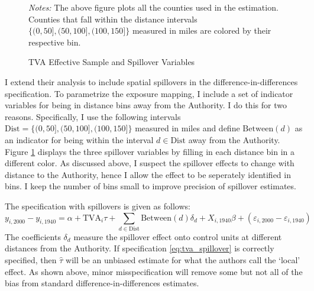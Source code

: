 \documentclass[11pt]{article}
\begin{document}
\begin{figure}[tb!]
    \caption{TVA Effective Sample and Spillover Variables}
    \label{fig:tva_sample}

    {\centering
    }

    {\footnotesize \textit{Notes:} The above figure plots all the counties used in the estimation. Counties that fall within the distance intervals $\{(0, 50], (50, 100], (100, 150]\}$ measured in miles are colored by their respective bin.}
\end{figure}

I extend their analysis to include spatial spillovers in the difference-in-differences specification. To parametrize the exposure mapping, I include a set of indicator variables for being in distance bins away from the Authority. I do this for two reasons. Specifically, I use the following intervals $\text{Dist} = \{(0, 50], (50, 100], (100, 150]\}$ measured in miles and define $\text{Between}(d)$ as an indicator for being within the interval $d \in \text{Dist}$ away from the Authority. Figure \ref{fig:tva_sample} displays the three spillover variables by filling in each distance bin in a different color. As discussed above, I suspect the spillover effects to change with distance to the Authority, hence I allow the effect to be seperately identified in bins. I keep the number of bins small to improve precision of spillover estimates. 

The specification with spillovers is given as follows:  
\begin{equation}\label{eq:tva_spillover}
    y_{i, 2000} - y_{i, 1940} = \alpha + \text{TVA}_i \tau + \sum_{d \in \text{Dist}} \text{Between}(d)\delta_d + X_{i, 1940} \beta + (\varepsilon_{i, 2000} - \varepsilon_{i, 1940})
\end{equation} 
The coefficients $\delta_d$ measure the spillover effect onto control units at different distances from the Authority. If specification \ref{eq:tva_spillover} is correctly specified, then $\hat{\tau}$ will be an unbiased estimate for what the authors call the `local' effect. As shown above, minor misspecification will remove some but not all of the bias from standard difference-in-differences estimates. 
\end{document}
